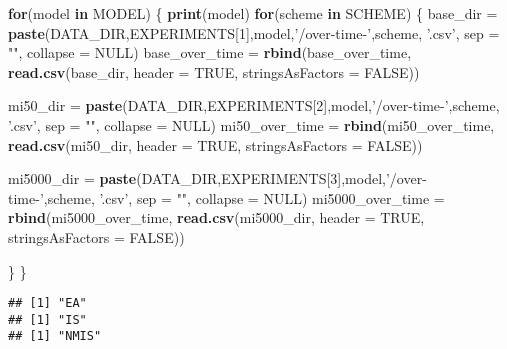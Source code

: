 \documentclass[]{book}
\newenvironment{Shaded}{\begin{snugshade}}{\end{snugshade}}
\newcommand{\ControlFlowTok}[1]{\textcolor[rgb]{0.13,0.29,0.53}{\textbf{#1}}}
\newcommand{\DataTypeTok}[1]{\textcolor[rgb]{0.13,0.29,0.53}{#1}}
\newcommand{\DecValTok}[1]{\textcolor[rgb]{0.00,0.00,0.81}{#1}}
\newcommand{\KeywordTok}[1]{\textcolor[rgb]{0.13,0.29,0.53}{\textbf{#1}}}
\newcommand{\NormalTok}[1]{#1}
\newcommand{\OtherTok}[1]{\textcolor[rgb]{0.56,0.35,0.01}{#1}}
\newcommand{\StringTok}[1]{\textcolor[rgb]{0.31,0.60,0.02}{#1}}
\begin{document}
\begin{Shaded}
\begin{Highlighting}[]
\ControlFlowTok{for}\NormalTok{(model }\ControlFlowTok{in}\NormalTok{ MODEL)}
\NormalTok{\{}
  \KeywordTok{print}\NormalTok{(model)}
  \ControlFlowTok{for}\NormalTok{(scheme }\ControlFlowTok{in}\NormalTok{ SCHEME)}
\NormalTok{  \{}
\NormalTok{    base_dir =}\StringTok{ }\KeywordTok{paste}\NormalTok{(DATA_DIR,EXPERIMENTS[}\DecValTok{1}\NormalTok{],model,}\StringTok{'/over-time-'}\NormalTok{,scheme, }\StringTok{'.csv'}\NormalTok{, }\DataTypeTok{sep =} \StringTok{""}\NormalTok{, }\DataTypeTok{collapse =} \OtherTok{NULL}\NormalTok{)}
\NormalTok{    base_over_time =}\StringTok{ }\KeywordTok{rbind}\NormalTok{(base_over_time, }\KeywordTok{read.csv}\NormalTok{(base_dir, }\DataTypeTok{header =} \OtherTok{TRUE}\NormalTok{, }\DataTypeTok{stringsAsFactors =} \OtherTok{FALSE}\NormalTok{))}

\NormalTok{    mi50_dir =}\StringTok{ }\KeywordTok{paste}\NormalTok{(DATA_DIR,EXPERIMENTS[}\DecValTok{2}\NormalTok{],model,}\StringTok{'/over-time-'}\NormalTok{,scheme, }\StringTok{'.csv'}\NormalTok{, }\DataTypeTok{sep =} \StringTok{""}\NormalTok{, }\DataTypeTok{collapse =} \OtherTok{NULL}\NormalTok{)}
\NormalTok{    mi50_over_time =}\StringTok{ }\KeywordTok{rbind}\NormalTok{(mi50_over_time, }\KeywordTok{read.csv}\NormalTok{(mi50_dir, }\DataTypeTok{header =} \OtherTok{TRUE}\NormalTok{, }\DataTypeTok{stringsAsFactors =} \OtherTok{FALSE}\NormalTok{))}

\NormalTok{    mi5000_dir =}\StringTok{ }\KeywordTok{paste}\NormalTok{(DATA_DIR,EXPERIMENTS[}\DecValTok{3}\NormalTok{],model,}\StringTok{'/over-time-'}\NormalTok{,scheme, }\StringTok{'.csv'}\NormalTok{, }\DataTypeTok{sep =} \StringTok{""}\NormalTok{, }\DataTypeTok{collapse =} \OtherTok{NULL}\NormalTok{)}
\NormalTok{    mi5000_over_time =}\StringTok{ }\KeywordTok{rbind}\NormalTok{(mi5000_over_time, }\KeywordTok{read.csv}\NormalTok{(mi5000_dir, }\DataTypeTok{header =} \OtherTok{TRUE}\NormalTok{, }\DataTypeTok{stringsAsFactors =} \OtherTok{FALSE}\NormalTok{))}

\NormalTok{  \}}
\NormalTok{\}}
\end{Highlighting}
\end{Shaded}

\begin{verbatim}
## [1] "EA"
## [1] "IS"
## [1] "NMIS"
\end{verbatim}
\end{document}
